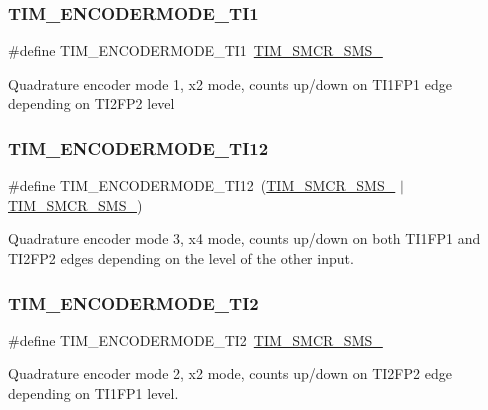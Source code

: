 \subsubsection{\texorpdfstring{TIM\_ENCODERMODE\_TI1}{TIM\_ENCODERMODE\_TI1}}
{\footnotesize\ttfamily \#define T\+I\+M\+\_\+\+E\+N\+C\+O\+D\+E\+R\+M\+O\+D\+E\+\_\+\+T\+I1~\mbox{\hyperlink{group___peripheral___registers___bits___definition_ga7d1ebece401aeb12abd466d2eafa78b2}{T\+I\+M\+\_\+\+S\+M\+C\+R\+\_\+\+S\+M\+S\+\_}}}

Quadrature encoder mode 1, x2 mode, counts up/down on T\+I1\+F\+P1 edge depending on T\+I2\+F\+P2 level \mbox{\label{group___t_i_m___encoder___mode_ga8046f1021dc578551fcff88891239e67}} 
\subsubsection{\texorpdfstring{TIM\_ENCODERMODE\_TI12}{TIM\_ENCODERMODE\_TI12}}
{\footnotesize\ttfamily \#define T\+I\+M\+\_\+\+E\+N\+C\+O\+D\+E\+R\+M\+O\+D\+E\+\_\+\+T\+I12~(\mbox{\hyperlink{group___peripheral___registers___bits___definition_gaa980a3121ab6cda5a4a42b959da8421e}{T\+I\+M\+\_\+\+S\+M\+C\+R\+\_\+\+S\+M\+S\+\_}} $\vert$ \mbox{\hyperlink{group___peripheral___registers___bits___definition_ga7d1ebece401aeb12abd466d2eafa78b2}{T\+I\+M\+\_\+\+S\+M\+C\+R\+\_\+\+S\+M\+S\+\_}})}

Quadrature encoder mode 3, x4 mode, counts up/down on both T\+I1\+F\+P1 and T\+I2\+F\+P2 edges depending on the level of the other input. \mbox{\label{group___t_i_m___encoder___mode_ga9166e985a35358cb3ed942c2a36e018d}} 
\subsubsection{\texorpdfstring{TIM\_ENCODERMODE\_TI2}{TIM\_ENCODERMODE\_TI2}}
{\footnotesize\ttfamily \#define T\+I\+M\+\_\+\+E\+N\+C\+O\+D\+E\+R\+M\+O\+D\+E\+\_\+\+T\+I2~\mbox{\hyperlink{group___peripheral___registers___bits___definition_gaa980a3121ab6cda5a4a42b959da8421e}{T\+I\+M\+\_\+\+S\+M\+C\+R\+\_\+\+S\+M\+S\+\_}}}

Quadrature encoder mode 2, x2 mode, counts up/down on T\+I2\+F\+P2 edge depending on T\+I1\+F\+P1 level. 